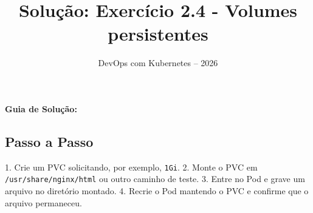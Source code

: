\documentclass[11pt,a4paper]{article}
\title{\color{secondary}\Huge\textbf{Solução: Exercício 2.4 - Volumes persistentes}}
\author{\color{primary}DevOps com Kubernetes -- 2026}
\date{}
\begin{document}
\maketitle


\textbf{Guia de Solução:}

\subsection*{\color{secondary}Passo a Passo}

1. Crie um PVC solicitando, por exemplo, \texttt{1Gi}.
2. Monte o PVC em \texttt{/usr/share/nginx/html} ou outro caminho de teste.
3. Entre no Pod e grave um arquivo no diretório montado.
4. Recrie o Pod mantendo o PVC e confirme que o arquivo permaneceu.
\end{document}

